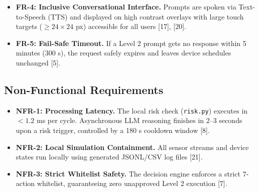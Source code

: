 \documentclass[conference]{IEEEtran}
\begin{document}
\begin{itemize}
  \begin{enumerate}
    \item \textbf{Level 1 (Low-Risk Autonomous Actions):} low power background
    tweaks (drum micro-ventilation, air purifier redirection, range hood
    extraction, pre-cooling) run automatically and log a plain-language summary [8].
    \item \textbf{Level 2 (High-Risk Approval Actions):} high-power operations or
    schedule changes (shifting heavy dryer runs to off-peak hours, cooktop
    preheating) strictly require user approval first [7].
  \end{enumerate}
  \item \textbf{FR-4: Inclusive Conversational Interface.} Prompts are spoken via
  Text-to-Speech (TTS) and displayed on high contrast overlays with large touch
  targets ($\geq 24 \times 24$ px) accessible for all users [17], [20].
  \item \textbf{FR-5: Fail-Safe Timeout.} If a Level 2 prompt gets no response
  within 5 minutes (300 s), the request safely expires and leaves device
  schedules unchanged [5].
\end{itemize}

\subsection{Non-Functional Requirements}
\begin{itemize}
  \item \textbf{NFR-1: Processing Latency.} The local risk check
  (\texttt{risk.py}) executes in $<1.2$ ms per cycle. Asynchronous LLM reasoning
  finishes in 2--3 seconds upon a risk trigger, controlled by a 180 s cooldown
  window [8].
  \item \textbf{NFR-2: Local Simulation Containment.} All sensor streams and
  device states run locally using generated JSONL/CSV log files [21].
  \item \textbf{NFR-3: Strict Whitelist Safety.} The decision engine enforces a
  strict 7-action whitelist, guaranteeing zero unapproved Level 2 execution [7].
\end{itemize}
\end{document}
